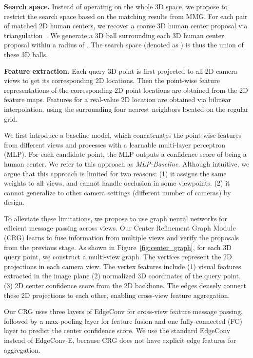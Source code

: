 \documentclass[10pt,twocolumn,letterpaper]{article}
\begin{document}
\textbf{Search space.} 
\label{sec:search_space}
Instead of operating on the whole 3D space, we propose to restrict the search space based on the matching results from MMG. For each pair of matched 2D human centers, we recover a coarse 3D human center proposal via triangulation~\cite{andrew2001multiple}. We generate a 3D ball surrounding each 3D human center proposal within a radius of . The search space (denoted as ) is thus the union of these 3D balls. 


\textbf{Feature extraction.} Each query 3D point is first projected to all 2D camera views to get its corresponding 2D locations. Then the point-wise feature representations of the corresponding 2D point locations are obtained from the 2D feature maps. Features for a real-value 2D location are obtained via bilinear interpolation, using the surrounding four nearest neighbors located on the regular grid. 

We first introduce a baseline model, which concatenates the point-wise features from different views and processes with a learnable multi-layer perceptron (MLP). For each candidate point, the MLP outputs a confidence score of being a human center. We refer to this approach as \emph{MLP-Baseline}. Although intuitive, we argue that this approach is limited for two reasons: (1) it assigns the same weights to all views, and cannot handle occlusion in some viewpoints. (2) it cannot generalize to other camera settings (different number of cameras) by design.

To alleviate these limitations, we propose to use graph neural networks for efficient message passing across views. Our Center Refinement Graph Module (CRG) learns to fuse information from multiple views and verify the proposals from the previous stage. As shown in Figure~\ref{fig:center_graph}, for each 3D query point, we construct a multi-view graph. The vertices represent the 2D projections in each camera view. The vertex features include (1) visual features  extracted in the image plane (2) normalized 3D coordinates  of the query point. (3) 2D center confidence score from the 2D backbone. The edges densely connect these 2D projections to each other, enabling cross-view feature aggregation. 

Our CRG uses three layers of EdgeConv for cross-view feature message passing, followed by a max-pooling layer for feature fusion and one fully-connected (FC) layer to predict the center confidence score. We use the standard EdgeConv instead of EdgeConv-E, because CRG does not have explicit edge features for aggregation.
\end{document}
